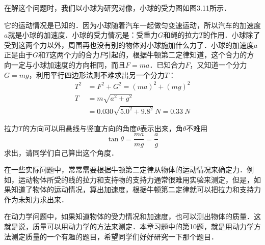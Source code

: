\begin{solution}
    在解这个问题时，我们以小球为研究对像，小球的受力图如图3.11所示．
    \begin{figure}[H]\centering
        \caption{}
    \end{figure}
    它的运动情况是已知的．因为小球随着汽车一起做匀变速运动，所以汽车的加速度$a$就是小球的加速度．小球的受力情况是：受重力$G$和绳的拉力$T$的作用．小球除了受到这两个力以外，周围再也没有别的物体对小球施加什么力了．小球的加速度$a$正是由于$G$和$T$这两个力的合力$F$引起的，根据牛顿第二定律知道，这个合力的方向一定与小球加速度的方向相同，而且$F=ma$．已知合力$F$，又知道一个分力$G=mg$，利用平行四边形法则不难求出另一个分力$T$：
    \begin{equation*}
        \begin{aligned}
            T^2 & =F^2+G^2=(ma)^2+(mg)^2                       \\
            T   & =m\sqrt{a^2+g^2}                             \\
                & =0.030\sqrt{5.0^2+9.8^2}~\si{N}=\SI{0.33}{N}
        \end{aligned}
    \end{equation*}
\end{solution}
拉力$T$的方向可以用悬线与竖直方向的角度$\theta$表示出来，角$\theta$不难用
\[\tan\theta =\frac{ma}{mg}=\frac{a}{g} \]
求出，请同学们自己算出这个角度．

在一些实际问题中，常常需要根据牛顿第二定律从物体的运动情况来确定力．例如，运动物体所受的线的拉力和支持物的支持力通常很难用实验来测定，但是，如果知道了物体的运动情况，算出加速度，根据牛顿第二定律就可以把拉力和支持力作为未知力求出来．

在动力学问题中，如果知道物体的受力情况和加速度，也可以测出物体的质量．这就是说，质量可以用动力学的方法来测定．本章习题中的第10题，就是用动力学方法测定质量的一个有趣的题目，希望同学们好好研究一下那个题目．


